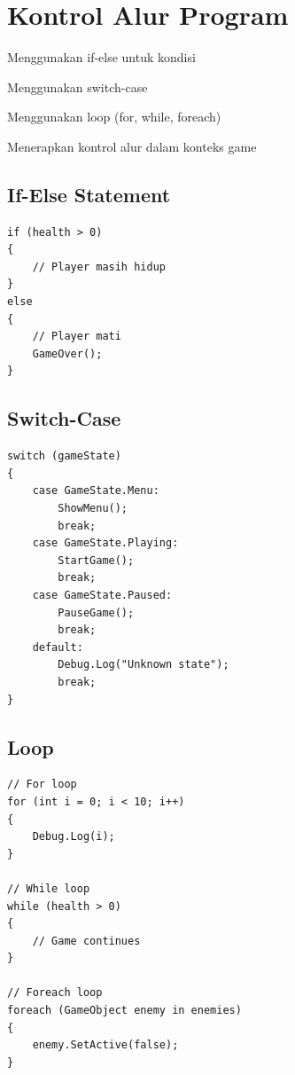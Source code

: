 
\section{Kontrol Alur Program}

\begin{learningoutcomes}
\item Menggunakan if-else untuk kondisi
\item Menggunakan switch-case
\item Menggunakan loop (for, while, foreach)
\item Menerapkan kontrol alur dalam konteks game
\end{learningoutcomes}

\subsection{If-Else Statement}

\begin{lstlisting}[language={[Sharp]C}]
if (health > 0)
{
    // Player masih hidup
}
else
{
    // Player mati
    GameOver();
}
\end{lstlisting}

\subsection{Switch-Case}

\begin{lstlisting}[language={[Sharp]C}]
switch (gameState)
{
    case GameState.Menu:
        ShowMenu();
        break;
    case GameState.Playing:
        StartGame();
        break;
    case GameState.Paused:
        PauseGame();
        break;
    default:
        Debug.Log("Unknown state");
        break;
}
\end{lstlisting}

\subsection{Loop}

\begin{lstlisting}[language={[Sharp]C}]
// For loop
for (int i = 0; i < 10; i++)
{
    Debug.Log(i);
}

// While loop
while (health > 0)
{
    // Game continues
}

// Foreach loop
foreach (GameObject enemy in enemies)
{
    enemy.SetActive(false);
}
\end{lstlisting}
